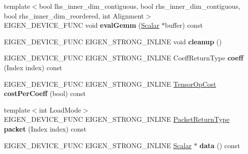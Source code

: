 \begin{DoxyCompactItemize}
\item 
\mbox{\label{struct_eigen_1_1_tensor_contraction_evaluator_base_aee0cb093c9876554ac9fecd6a96d4d87}} 
{\footnotesize template$<$bool lhs\+\_\+inner\+\_\+dim\+\_\+contiguous, bool rhs\+\_\+inner\+\_\+dim\+\_\+contiguous, bool rhs\+\_\+inner\+\_\+dim\+\_\+reordered, int Alignment$>$ }\\E\+I\+G\+E\+N\+\_\+\+D\+E\+V\+I\+C\+E\+\_\+\+F\+U\+NC void {\bfseries eval\+Gemm} (\hyperlink{group___sparse_core___module}{Scalar} $\ast$buffer) const
\item 
\mbox{\label{struct_eigen_1_1_tensor_contraction_evaluator_base_a56030af621dbf3097cef597ecb2b180a}} 
E\+I\+G\+E\+N\+\_\+\+D\+E\+V\+I\+C\+E\+\_\+\+F\+U\+NC E\+I\+G\+E\+N\+\_\+\+S\+T\+R\+O\+N\+G\+\_\+\+I\+N\+L\+I\+NE void {\bfseries cleanup} ()
\item 
\mbox{\label{struct_eigen_1_1_tensor_contraction_evaluator_base_af35dc8f04e25238ed04628398d1adc53}} 
E\+I\+G\+E\+N\+\_\+\+D\+E\+V\+I\+C\+E\+\_\+\+F\+U\+NC E\+I\+G\+E\+N\+\_\+\+S\+T\+R\+O\+N\+G\+\_\+\+I\+N\+L\+I\+NE Coeff\+Return\+Type {\bfseries coeff} (Index index) const
\item 
\mbox{\label{struct_eigen_1_1_tensor_contraction_evaluator_base_ad0f21541238d3add97d114afb6859b0f}} 
E\+I\+G\+E\+N\+\_\+\+D\+E\+V\+I\+C\+E\+\_\+\+F\+U\+NC E\+I\+G\+E\+N\+\_\+\+S\+T\+R\+O\+N\+G\+\_\+\+I\+N\+L\+I\+NE \hyperlink{class_eigen_1_1_tensor_op_cost}{Tensor\+Op\+Cost} {\bfseries cost\+Per\+Coeff} (bool) const
\item 
\mbox{\label{struct_eigen_1_1_tensor_contraction_evaluator_base_a430b83d71a67ba792130b8d36c049a9f}} 
{\footnotesize template$<$int Load\+Mode$>$ }\\E\+I\+G\+E\+N\+\_\+\+D\+E\+V\+I\+C\+E\+\_\+\+F\+U\+NC E\+I\+G\+E\+N\+\_\+\+S\+T\+R\+O\+N\+G\+\_\+\+I\+N\+L\+I\+NE \hyperlink{group___sparse_core___module}{Packet\+Return\+Type} {\bfseries packet} (Index index) const
\item 
\mbox{\label{struct_eigen_1_1_tensor_contraction_evaluator_base_a6babd619ca988fb16d5859c516308730}} 
E\+I\+G\+E\+N\+\_\+\+D\+E\+V\+I\+C\+E\+\_\+\+F\+U\+NC E\+I\+G\+E\+N\+\_\+\+S\+T\+R\+O\+N\+G\+\_\+\+I\+N\+L\+I\+NE \hyperlink{group___sparse_core___module}{Scalar} $\ast$ {\bfseries data} () const
\end{DoxyCompactItemize}
